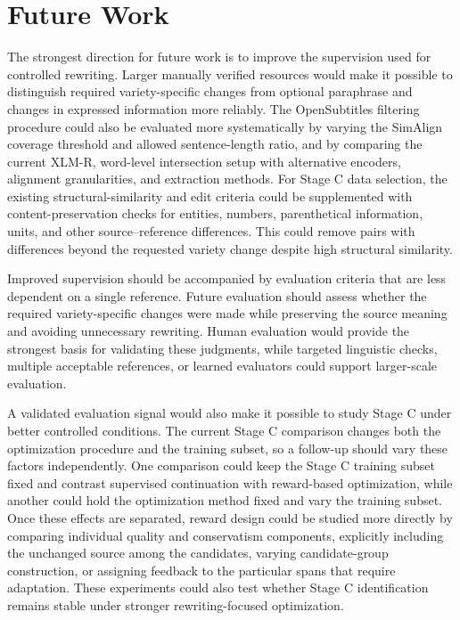 \section{Future Work}
\label{sec:conclusion-future-work}

{
The strongest direction for future work is to improve the supervision used for
controlled rewriting. Larger manually verified resources would make it possible
to distinguish required variety-specific changes from optional paraphrase and
changes in expressed information more reliably. The OpenSubtitles filtering
procedure could also be evaluated more systematically by varying the SimAlign
coverage threshold and allowed sentence-length ratio, and by comparing the
current XLM-R, word-level intersection setup with alternative encoders,
alignment granularities, and extraction methods. For Stage C data selection, the
existing structural-similarity and edit criteria could be supplemented with
content-preservation checks for entities, numbers, parenthetical information,
units, and other source--reference differences. This could remove pairs with
differences beyond the requested variety change despite high structural
similarity.\par}

{
Improved supervision should be accompanied by evaluation criteria that are less
dependent on a single reference. Future evaluation should assess whether the
required variety-specific changes were made while preserving the source meaning
and avoiding unnecessary rewriting. Human evaluation would provide the
strongest basis for validating these judgments, while targeted linguistic
checks, multiple acceptable references, or learned evaluators could support
larger-scale evaluation.\par}

{
A validated evaluation signal would also make it possible to study Stage C
under better controlled conditions. The current Stage C comparison changes both
the optimization procedure and the training subset, so a follow-up should vary
these factors independently. One comparison could keep the Stage C training
subset fixed and contrast supervised continuation with reward-based
optimization, while another could hold the optimization method fixed and vary
the training subset. Once these effects are separated, reward design could be
studied more directly by comparing individual quality and conservatism
components, explicitly including the unchanged source among the candidates,
varying candidate-group construction, or assigning feedback to the particular
spans that require adaptation. These experiments could also test whether Stage C identification remains stable
under stronger rewriting-focused optimization.\par}

